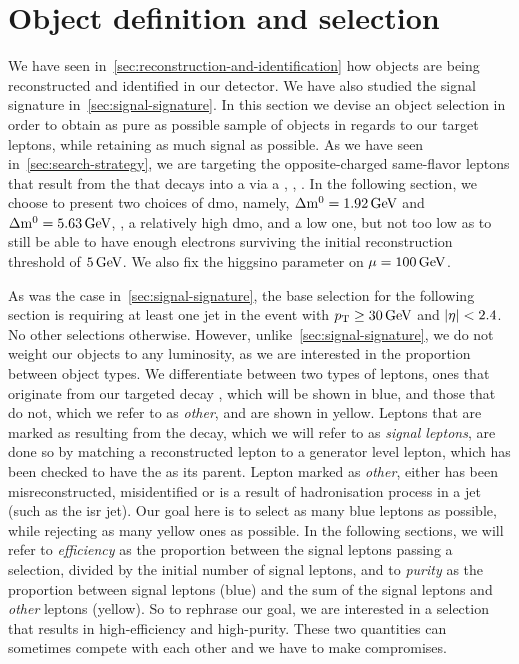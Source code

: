 \clearpage
\section{Object definition and selection}
\label{sec:object-selection}
We have seen in~\ref{sec:reconstruction-and-identification} how objects are being reconstructed and identified in our detector. We have also studied the signal signature in~\ref{sec:signal-signature}. In this section we devise an object selection in order to obtain as pure as possible sample of objects in regards to our target leptons, while retaining as much signal as possible. As we have seen in~\ref{sec:search-strategy}, we are targeting the opposite-charged same-flavor leptons \ellell that result from the \neutt that decays into a \neuto via a \PZstar, \ie, \neuttdecay. In the following section, we choose to present two choices of \gls{dmo}, namely, $\Delta\mathrm{m}^0=1.92\,\text{Ge\hspace{-.08em}V}$ and $\Delta\mathrm{m}^0=5.63\,\text{Ge\hspace{-.08em}V}$, \ie, a relatively high \gls{dmo}, and a low one, but not too low as to still be able to have enough electrons surviving the initial reconstruction \pt threshold of $5\,\text{Ge\hspace{-.08em}V}$. We also fix the higgsino parameter on $\mu=100\,\text{Ge\hspace{-.08em}V}$.

As was the case in~\ref{sec:signal-signature}, the base selection for the following section is requiring at least one jet in the event with $p_{\mathrm{T}} \geq 30\,\text{Ge\hspace{-.08em}V}$ and $\lvert \eta \rvert<2.4$. No other selections otherwise. However, unlike~\ref{sec:signal-signature}, we do not weight our objects to any luminosity, as we are interested in the proportion between object types. We differentiate between two types of leptons, ones that originate from our targeted decay \neuttdecay, which will be shown in blue, and those that do not, which we refer to as \emph{other}, and are shown in yellow. Leptons that are marked as resulting from the \neuttdecay decay, which we will refer to as \emph{signal leptons}, are done so by matching a reconstructed lepton to a generator level lepton, which has been checked to have the \neutt as its parent. Lepton marked as \emph{other}, either has been misreconstructed, misidentified or is a result of hadronisation process in a jet (such as the \gls{isr} jet). Our goal here is to select as many blue leptons as possible, while rejecting as many yellow ones as possible. In the following sections, we will refer to \emph{efficiency} as the proportion between the signal leptons passing a selection, divided by the initial number of signal leptons, and to \emph{purity} as the proportion between signal leptons (blue) and the sum of the signal leptons and \emph{other} leptons (yellow). So to rephrase our goal, we are interested in a selection that results in high-efficiency and high-purity. These two quantities can sometimes compete with each other and we have to make compromises.

